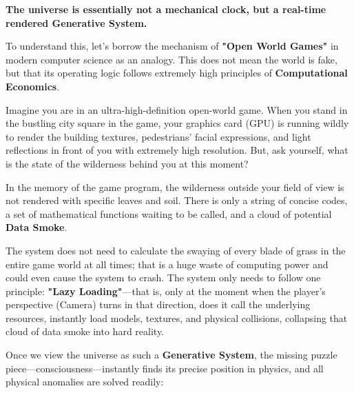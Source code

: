 \textbf{The universe is essentially not a mechanical clock, but a real-time rendered \textbf{Generative System}.}

To understand this, let's borrow the mechanism of \textbf{"Open World Games"} in modern computer science as an analogy. This does not mean the world is fake, but that its operating logic follows extremely high principles of \textbf{Computational Economics}.

Imagine you are in an ultra-high-definition open-world game. When you stand in the bustling city square in the game, your graphics card (GPU) is running wildly to render the building textures, pedestrians' facial expressions, and light reflections in front of you with extremely high resolution. But, ask yourself, what is the state of the wilderness behind you at this moment?

In the memory of the game program, the wilderness outside your field of view is not rendered with specific leaves and soil. There is only a string of concise codes, a set of mathematical functions waiting to be called, and a cloud of potential \textbf{Data Smoke}.

The system does not need to calculate the swaying of every blade of grass in the entire game world at all times; that is a huge waste of computing power and could even cause the system to crash. The system only needs to follow one principle: \textbf{"Lazy Loading"}—that is, only at the moment when the player's perspective (Camera) turns in that direction, does it call the underlying resources, instantly load models, textures, and physical collisions, collapsing that cloud of data smoke into hard reality.

Once we view the universe as such a \textbf{Generative System}, the missing puzzle piece—consciousness—instantly finds its precise position in physics, and all physical anomalies are solved readily:

